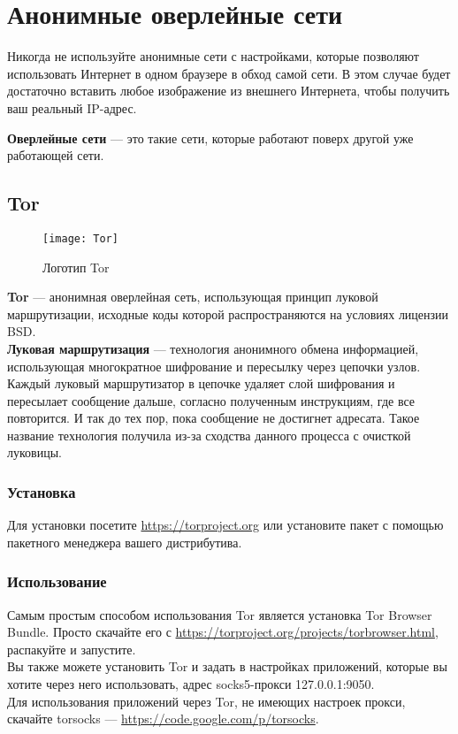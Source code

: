 \section{Анонимные оверлейные сети}
\begin{important}
Никогда не используйте анонимные сети с настройками, которые позволяют использовать Интернет в одном браузере в обход самой сети. В этом случае будет достаточно вставить любое изображение из внешнего Интернета, чтобы получить ваш реальный IP-адрес.
\end{important}
\textbf{Оверлейные сети} --- это такие сети, которые работают поверх другой уже работающей сети.
\subsection{Tor}
\begin{wrapfigure}[9]{r}{0.25\linewidth}
\texttt{[image: Tor]}
\caption{Логотип Tor}
\end{wrapfigure}
\textbf{Tor} --- анонимная оверлейная сеть, использующая принцип луковой маршрутизации, исходные коды которой распространяются на условиях лицензии BSD\cite{tor_license}.\\
\textbf{Луковая маршрутизация} --- технология анонимного обмена информацией, использующая многократное шифрование и пересылку через цепочки узлов. Каждый луковый маршрутизатор в цепочке удаляет слой шифрования и пересылает сообщение дальше, согласно полученным инструкциям, где все повторится. И так до тех пор, пока сообщение не достигнет адресата. Такое название технология получила из-за сходства данного процесса с очисткой луковицы.\\
\subsubsection{Установка}
Для установки посетите \url{https://torproject.org} или установите пакет с помощью пакетного менеджера вашего дистрибутива.
\subsubsection{Использование}
Самым простым способом использования Tor является установка Tor Browser Bundle. Просто скачайте его с \url{https://torproject.org/projects/torbrowser.html}, распакуйте и запустите.\\
Вы также можете установить Tor и задать в настройках приложений, которые вы хотите через него использовать, адрес socks5-прокси 127.0.0.1:9050.\\
Для использования приложений через Tor, не имеющих настроек прокси, скачайте torsocks --- \url{https://code.google.com/p/torsocks}.
